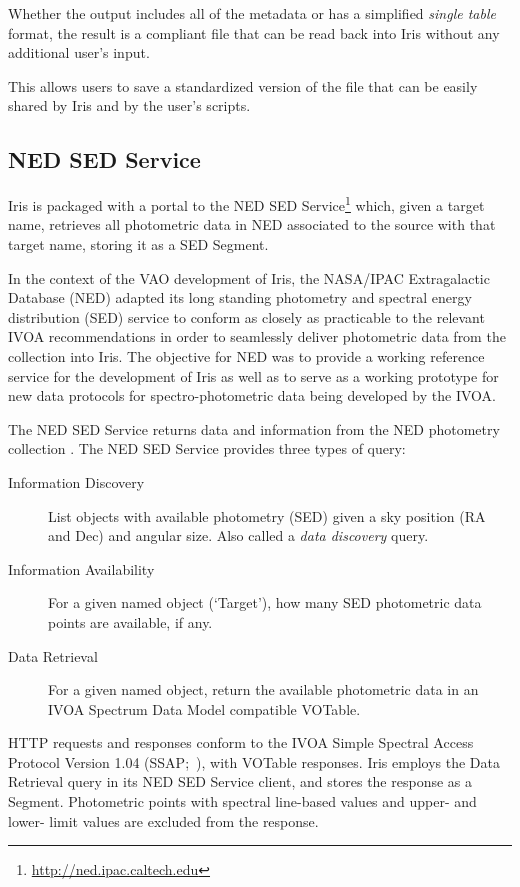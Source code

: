 \documentclass[final,5p]{elsarticle}
\begin{document}
Whether the output includes all of the metadata or has a simplified \emph{single table} format, the result is a compliant file that can be read back into Iris without any additional user's input.

This allows users to save a standardized version of the file that can be easily shared by Iris and by the user's scripts.

\subsection{NED SED Service}
\label{subsec:ned}

Iris is packaged with a portal to the NED SED Service\footnote{\url{http://ned.ipac.caltech.edu}} which, given a target name, retrieves all photometric data in NED associated to the source with that target name, storing it as a SED Segment.

In the context of the VAO development of Iris, the NASA/IPAC Extragalactic Database (NED) adapted its long standing photometry and spectral energy distribution (SED) service to conform as closely as practicable to the relevant IVOA recommendations in order to seamlessly deliver photometric data from the collection into Iris. The objective for NED was to provide a working reference service for the development of Iris as well as to serve as a working prototype for new data protocols for spectro-photometric data being developed by the IVOA.

The NED SED Service returns data and information from the NED photometry collection \citep{2007ASPC..376..153M}. The NED SED Service provides three types of query:
\begin{description}
 \item[Information Discovery] List objects with available photometry (SED) given a sky position (RA and Dec) and angular size.  Also called a \emph{data discovery} query.
 \item[Information Availability] For a given named object (`Target'), how many SED photometric data points are available, if any.
 \item[Data Retrieval] For a given named object, return the available photometric data in an IVOA Spectrum Data Model compatible VOTable.
\end{description}

HTTP requests and responses conform to the IVOA Simple Spectral Access Protocol Version 1.04 (SSAP;~\citep{2012arXiv1203.5725T}), with VOTable responses. Iris employs the Data Retrieval query in its NED SED Service client, and stores the response as a Segment. Photometric points with spectral line-based values and upper- and lower- limit values are excluded from the response.
\end{document}
